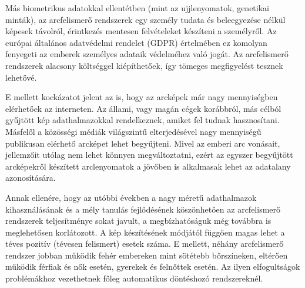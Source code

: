 Más biometrikus adatokkal ellentétben (mint az ujjlenyomatok, genetikai minták), az arcfelismerő rendszerek egy személy tudata és beleegyezése nélkül képesek távolról, érintkezés mentesen felvételeket készíteni a személyről. Az európai általános adatvédelmi rendelet (GDPR) értelmében ez komolyan fenyegeti az emberek személyes adataik védelméhez való jogát. Az arcfelismerő rendszerek alacsony költséggel kiépíthetőek, így tömeges megfigyelést tesznek lehetővé. 

E mellett kockázatot jelent az is, hogy az arcképek már nagy mennyiségben elérhetőek az interneten. Az állami, vagy magán cégek korábbról, más célból gyűjtött kép adathalmazokkal rendelkeznek, amiket fel tudnak hasznosítani. Másfelől a közösségi médiák világszintű elterjedésével nagy mennyiségű publikusan elérhető arcképet lehet begyűjteni. Mivel az emberi arc vonásait, jellemzőit utólag nem lehet könnyen megváltoztatni, ezért az egyszer begyűjtött arcképekről készített arclenyomatok a jövőben is alkalmasak lehet az adatalany azonosítására.

Annak ellenére, hogy az utóbbi években a nagy méretű adathalmazok kihasználásának és a mély tanulás fejlődésének köszönhetően az arcfelismerő rendszerek teljesítménye sokat javult, a megbízhatóságuk még továbbra is meglehetősen korlátozott. A kép készítésének módjától függően magas lehet a téves pozitív (tévesen felismert) esetek száma. E mellett, néhány arcfelismerő rendszer jobban működik fehér embereken mint sötétebb bőrszíneken, eltérően működik férfiak és nők esetén, gyerekek és felnőttek esetén. Az ilyen elfogultságok problémákhoz vezethetnek főleg automatikus döntéshozó rendszereknél.




